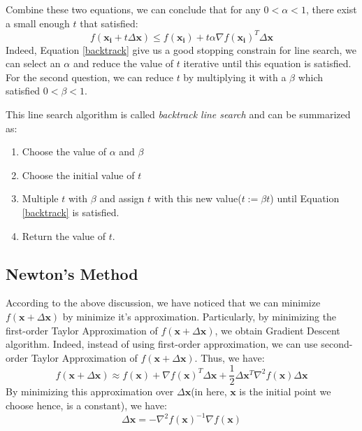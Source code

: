 \documentclass[10pt,a4paper]{article}
\begin{document}
Combine these two equations, we can conclude that for any $0 < \alpha < 1$, there exist a small enough $t$ that satisfied:
\begin{equation}
	f(\mathbf{x_{i}} + t \Delta \mathbf{x}) \leq f(\mathbf{x_{i}}) + t \alpha \nabla f(\mathbf{x_{i}})^{T} \Delta \mathbf{x}
	\label{backtrack}
\end{equation}
Indeed, Equation \ref{backtrack} give us a good stopping constrain for line search, we can select an $\alpha$ and reduce the value of $t$ iterative until this equation is satisfied. For the second question, we can reduce $t$ by multiplying it with a $\beta$ which satisfied $0 < \beta < 1$.

This line search algorithm is called \textit{backtrack line search} and can be summarized as:
\begin{enumerate}
	\item Choose the value of $\alpha$ and $\beta$
	\item Choose the initial value of $t$
	\item Multiple $t$ with $\beta$ and assign $t$ with this new value($t := \beta t$) until Equation \ref{backtrack} is satisfied.
	\item Return the value of $t$.
\end{enumerate}

\subsection{Newton's Method}
According to the above discussion, we have noticed that we can minimize $f(\mathbf{x} + \Delta \mathbf{x})$ by minimize it's approximation. Particularly, by minimizing the first-order Taylor Approximation of $f(\mathbf{x} + \Delta \mathbf{x})$, we obtain Gradient Descent algorithm. Indeed, instead of using first-order approximation, we can use second-order Taylor Approximation of $f(\mathbf{x} + \Delta \mathbf{x})$. Thus, we have:
\begin{equation*}
	f(\mathbf{x} + \Delta \mathbf{x}) \approx f(\mathbf{x}) + \nabla f(\mathbf{x})^{T} \Delta \mathbf{x} + \frac{1}{2} \Delta \mathbf{x}^{T} \nabla^{2} f(\mathbf{x}) \Delta \mathbf{x}
\end{equation*}
By minimizing this approximation over $\Delta \mathbf{x}$(in here, $\mathbf{x}$ is the initial point we choose hence, is a constant), we have:
\begin{equation*}
	\Delta \mathbf{x} = -\nabla^{2} f(\mathbf{x})^{-1} \nabla f(\mathbf{x})
\end{equation*}
\end{document}
